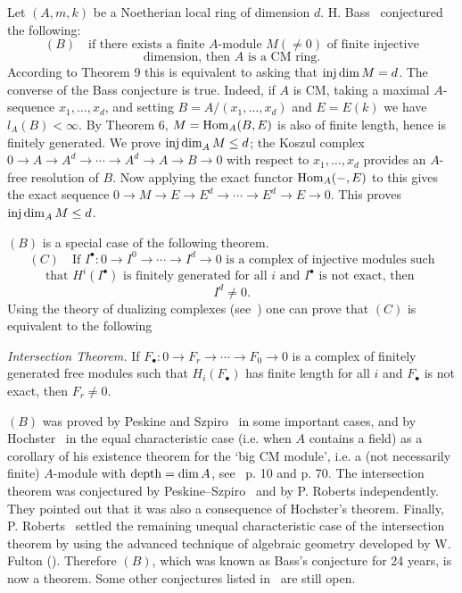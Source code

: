 \begin{remark}
Let $(A, m, k)$ be
a Noetherian local ring of dimension $d$. H. Bass~\cite{Ba1} conjectured the
following:
\[
  (B) \quad \text{if there exists a finite } A\text{-module } M (\neq 0) \text{ of finite injective}
\]
\[
  \text{dimension, then } A \text{ is a CM ring.}
\]
According to Theorem 9 this is equivalent to asking that $\operatorname{inj\,dim} M = d$.
The converse of the Bass conjecture is true. Indeed, if $A$ is CM, taking a
maximal $A$-sequence $x_1, \ldots, x_d$, and setting $B = A/(x_1, \ldots, x_d)$ and $E = E(k)$
we have $l_A(B) < \infty$. By Theorem 6, $M = \operatorname{Hom}_A(B, E)$ is also of finite length,
hence is finitely generated. We prove $\operatorname{inj\,dim}_A M \le d$; the Koszul complex
$0 \to A \to A^d \to \cdots \to A^d \to A \to B \to 0$ with respect to $x_1, \ldots, x_d$ provides an $A$-
free resolution of $B$. Now applying the exact functor $\operatorname{Hom}_A(-, E)$ to this
gives the exact sequence $0 \to M \to E \to E^d \to \cdots \to E^d \to E \to 0$. This proves
$\operatorname{inj\,dim}_A M \le d$.

$(B)$ is a special case of the following theorem.
\[
  (C) \quad \text{If } I^\bullet\colon 0 \to I^0 \to \cdots \to I^d \to 0 \text{ is a complex of injective modules such}
\]
\[
  \text{that } H^i(I^\bullet) \text{ is finitely generated for all } i \text{ and } I^\bullet \text{ is not exact, then }
\]
\[
  I^d \neq 0.
\]
Using the theory of dualizing complexes (see~\cite{Rob}) one can prove that $(C)$
is equivalent to the following

\emph{Intersection Theorem.} If $F_\bullet\colon 0 \to F_r \to \cdots \to F_0 \to 0$ is a complex of finitely
generated free modules such that $H_i(F_\bullet)$ has finite length for all $i$ and $F_\bullet$ is
not exact, then $F_r \neq 0$.

$(B)$ was proved by Peskine and Szpiro~\cite{PS1} in some important cases, and
by Hochster~\cite{H} in the equal characteristic case (i.e. when $A$ contains a
field) as a corollary of his existence theorem for the `big CM module', i.e. a
(not necessarily finite) $A$-module with $\operatorname{depth} = \dim A$, see~\cite{H} p. 10 and
p. 70. The intersection theorem was conjectured by Peskine--Szpiro~\cite{PS3} and
by P. Roberts independently. They pointed out that it was also a
consequence of Hochster's theorem. Finally, P. Roberts~\cite{Rob3} settled the
remaining unequal characteristic case of the intersection theorem by using
the advanced technique of algebraic geometry developed by W. Fulton
(\cite{Ful}). Therefore $(B)$, which was known as Bass's conjecture for 24 years,
is now a theorem. Some other conjectures listed in~\cite{H} are still open.
\end{remark}

